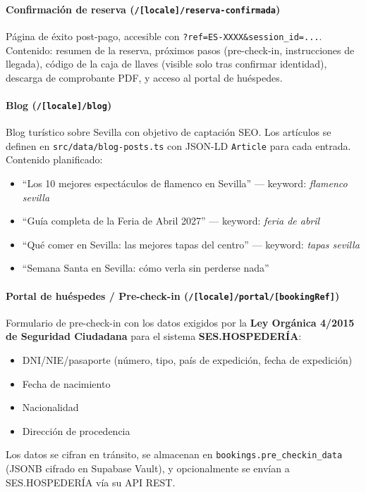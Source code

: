 \documentclass[12pt,a4paper,twoside,openright]{report}
\begin{document}
\paragraph{Confirmación de reserva (\texttt{/[locale]/reserva-confirmada})}
Página de éxito post-pago, accesible con \texttt{?ref=ES-XXXX\&session\_id=...}.
Contenido: resumen de la reserva, próximos pasos (pre-check-in, instrucciones de
llegada), código de la caja de llaves (visible solo tras confirmar identidad),
descarga de comprobante PDF, y acceso al portal de huéspedes.

\paragraph{Blog (\texttt{/[locale]/blog})}
Blog turístico sobre Sevilla con objetivo de captación SEO. Los artículos se definen
en \texttt{src/data/blog-posts.ts} con JSON-LD \texttt{Article} para cada entrada.
Contenido planificado:
\begin{itemize}
  \item ``Los 10 mejores espectáculos de flamenco en Sevilla'' — keyword: \emph{flamenco sevilla}
  \item ``Guía completa de la Feria de Abril 2027'' — keyword: \emph{feria de abril}
  \item ``Qué comer en Sevilla: las mejores tapas del centro'' — keyword: \emph{tapas sevilla}
  \item ``Semana Santa en Sevilla: cómo verla sin perderse nada''
\end{itemize}

\paragraph{Portal de huéspedes / Pre-check-in (\texttt{/[locale]/portal/[bookingRef]})}
Formulario de pre-check-in con los datos exigidos por la
\textbf{Ley Orgánica 4/2015 de Seguridad Ciudadana} para el sistema
\textbf{SES.HOSPEDERÍA}:
\begin{itemize}
  \item DNI/NIE/pasaporte (número, tipo, país de expedición, fecha de expedición)
  \item Fecha de nacimiento
  \item Nacionalidad
  \item Dirección de procedencia
\end{itemize}
Los datos se cifran en tránsito, se almacenan en \texttt{bookings.pre\_checkin\_data}
(JSONB cifrado en Supabase Vault), y opcionalmente se envían a SES.HOSPEDERÍA
vía su API REST.
\end{document}

